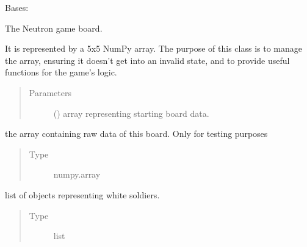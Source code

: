 \documentclass[letterpaper,10pt,english,openany,oneside]{sphinxmanual}
\begin{document}

\begin{fulllineitems}
\label{\detokenize{neutron:neutron.NeutronBoard}}
Bases: 

The Neutron game board.

It is represented by a 5x5 NumPy array. The purpose of this class is to
manage the array, ensuring it doesn’t get into an invalid state, and to
provide useful functions for the game’s logic.
\begin{quote}\begin{description}
\item[{Parameters}] \leavevmode
{} () \textendash{} array representing starting board data.

\end{description}\end{quote}

\begin{fulllineitems}
\label{\detokenize{neutron:neutron.NeutronBoard.grid}}
the array containing raw data of this board. Only
for testing purposes
\begin{quote}\begin{description}
\item[{Type}] \leavevmode
numpy.array

\end{description}\end{quote}

\end{fulllineitems}


\begin{fulllineitems}
\label{\detokenize{neutron:neutron.NeutronBoard.white_soldiers}}
list of {\hyperref[\detokenize{neutron:neutron.Soldier}]{}} objects representing white soldiers.
\begin{quote}\begin{description}
\item[{Type}] \leavevmode
list


\end{description}
\end{quote}
\end{fulllineitems}
\end{fulllineitems}
\end{document}

